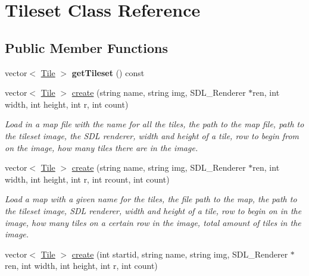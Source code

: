 \hypertarget{classTileset}{}\section{Tileset Class Reference}
\label{classTileset}
\subsection*{Public Member Functions}
\begin{DoxyCompactItemize}
\item 
vector$<$ \hyperlink{classTile}{Tile} $>$ {\bfseries get\+Tileset} () const \hypertarget{classTileset_ae5f7859d69952b223bdb322796bcc9f2}{}\label{classTileset_ae5f7859d69952b223bdb322796bcc9f2}

\item 
vector$<$ \hyperlink{classTile}{Tile} $>$ \hyperlink{classTileset_ad11cd044d9a2907003fee3baacba86e7}{create} (string name, string img, S\+D\+L\+\_\+\+Renderer $\ast$ren, int width, int height, int r, int count)\hypertarget{classTileset_ad11cd044d9a2907003fee3baacba86e7}{}\label{classTileset_ad11cd044d9a2907003fee3baacba86e7}

\begin{DoxyCompactList}\small\item\em Load in a map file with the name for all the tiles, the path to the map file, path to the tileset image, the S\+DL renderer, width and height of a tile, row to begin from on the image, how many tiles there are in the image. \end{DoxyCompactList}\item 
vector$<$ \hyperlink{classTile}{Tile} $>$ \hyperlink{classTileset_a1435c7ce70c5aa6da6388762971917aa}{create} (string name, string img, S\+D\+L\+\_\+\+Renderer $\ast$ren, int width, int height, int r, int rcount, int count)\hypertarget{classTileset_a1435c7ce70c5aa6da6388762971917aa}{}\label{classTileset_a1435c7ce70c5aa6da6388762971917aa}

\begin{DoxyCompactList}\small\item\em Load a map with a given name for the tiles, the file path to the map, the path to the tileset image, S\+DL renderer, width and height of a tile, row to begin on in the image, how many tiles on a certain row in the image, total amount of tiles in the image. \end{DoxyCompactList}\item 
vector$<$ \hyperlink{classTile}{Tile} $>$ \hyperlink{classTileset_a9d93cb00fc20938748075d94be118ed6}{create} (int startid, string name, string img, S\+D\+L\+\_\+\+Renderer $\ast$ren, int width, int height, int r, int count)\hypertarget{classTileset_a9d93cb00fc20938748075d94be118ed6}{}\label{classTileset_a9d93cb00fc20938748075d94be118ed6}


\end{DoxyCompactItemize}
